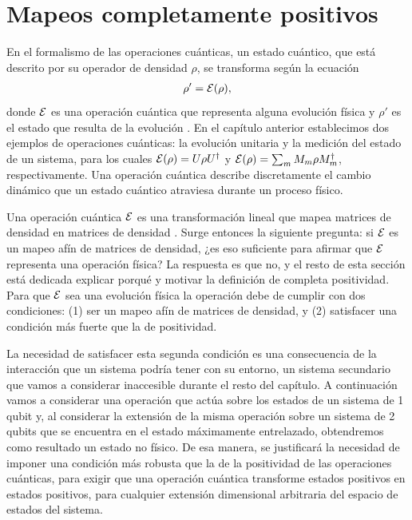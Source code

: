\section{Mapeos completamente positivos} %
En el formalismo de las operaciones cuánticas, un estado cuántico,
que está descrito por su operador de densidad $\rho$,
se transforma según la ecuación 
\begin{align}
\rho' = \mathcal{E} (\rho)
\label{eq:E(rho)},
\end{align} 
donde $\mathcal{E}$ es una operación cuántica que representa alguna evolución 
física y $\rho'$ es el estado que resulta de la evolución 
\cite{nielsen_chuang_2011}. 
En el capítulo anterior  establecimos 
dos ejemplos de operaciones cuánticas: la evolución unitaria 
y la medición del estado de un sistema, 
para los cuales $\mathcal{E} \qty(\rho)=U\rho U^{\dagger}$ y 
$\mathcal{E}(\rho)=\sum_m M_m\rho M_m^{\dagger}$, respectivamente. 
Una operación cuántica describe discretamente 
el cambio dinámico que un estado cuántico 
atraviesa durante un proceso físico. 

Una operación cuántica $\mathcal{E}$ es
una transformación lineal que mapea matrices de densidad en matrices 
de densidad \cite{bengtsson_zyczkowski_2017}. Surge entonces la siguiente
pregunta: si $\mathcal{E}$ es un mapeo afín de matrices de densidad, ¿es eso
suficiente para afirmar que $\mathcal{E}$ representa una operación física? 
La respuesta es que no, y el resto de esta sección está dedicada
explicar porqué y motivar la definición de completa positividad.  
Para que $\mathcal{E}$ sea una evolución física la operación debe de cumplir con dos
condiciones: (1) ser un mapeo afín de matrices de densidad, 
y (2) satisfacer una condición más fuerte que la de positividad. 

La necesidad de satisfacer esta segunda condición
es una consecuencia de la interacción que un sistema podría tener
con su entorno, un sistema secundario que vamos 
a considerar inaccesible durante el resto del capítulo.
A continuación vamos a considerar una operación 
que actúa sobre los estados de un sistema de
1 qubit y, al considerar la extensión de la misma operación
sobre un sistema de 2 qubits que se encuentra en
el estado máximamente entrelazado,
obtendremos como resultado un estado no físico.
De esa manera, se justificará la necesidad de imponer 
una condición más robusta que la de la positividad 
de las operaciones cuánticas, para exigir 
que una operación cuántica transforme estados 
positivos en estados positivos, para cualquier
extensión dimensional arbitraria del espacio
de estados del sistema.


